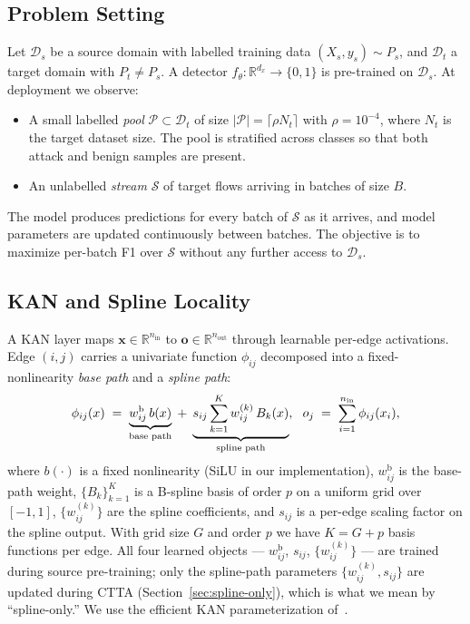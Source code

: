 \documentclass[10pt, conference, letterpaper]{IEEEtran}
\begin{document}
\subsection{Problem Setting}
\label{sec:problem}

Let $\mathcal{D}_s$ be a source domain with labelled training data $(X_s, y_s) \sim P_s$, and $\mathcal{D}_t$ a target domain with $P_t \neq P_s$. A detector $f_\theta : \mathbb{R}^{d_x} \to \{0,1\}$ is pre-trained on $\mathcal{D}_s$. At deployment we observe:
\begin{itemize}
    \item A small labelled \emph{pool} $\mathcal{P} \subset \mathcal{D}_t$ of size $|\mathcal{P}| = \lceil \rho N_t \rceil$ with $\rho = 10^{-4}$, where $N_t$ is the target dataset size. The pool is stratified across classes so that both attack and benign samples are present.
    \item An unlabelled \emph{stream} $\mathcal{S}$ of target flows arriving in batches of size $B$.
\end{itemize}
The model produces predictions for every batch of $\mathcal{S}$ as it arrives, and model parameters are updated continuously between batches. The objective is to maximize per-batch F1 over $\mathcal{S}$ without any further access to $\mathcal{D}_s$.

\subsection{KAN and Spline Locality}
\label{sec:kan}

A KAN layer maps $\mathbf{x} \in \mathbb{R}^{n_{\text{in}}}$ to $\mathbf{o} \in \mathbb{R}^{n_{\text{out}}}$ through learnable per-edge activations. Edge $(i,j)$ carries a univariate function $\phi_{ij}$ decomposed into a fixed-nonlinearity \emph{base path} and a \emph{spline path}:
\begin{equation}
\label{eq:kan-edge}
\phi_{ij}(x) \;=\; \underbrace{w^{\text{b}}_{ij}\, b(x)}_{\text{base path}} \;+\; \underbrace{s_{ij}\sum_{k=1}^{K} w_{ij}^{(k)}\, B_k(x)}_{\text{spline path}}, 
\hspace{1.5ex}
o_j \;=\; \sum_{i=1}^{n_{\text{in}}} \phi_{ij}(x_i),
\end{equation}
where $b(\cdot)$ is a fixed nonlinearity (SiLU in our implementation), $w^{\text{b}}_{ij}$ is the base-path weight, $\{B_k\}_{k=1}^{K}$ is a B-spline basis of order $p$ on a uniform grid over $[-1, 1]$, $\{w_{ij}^{(k)}\}$ are the spline coefficients, and $s_{ij}$ is a per-edge scaling factor on the spline output. With grid size $G$ and order $p$ we have $K = G + p$ basis functions per edge. All four learned objects --- $w^{\text{b}}_{ij}$, $s_{ij}$, $\{w_{ij}^{(k)}\}$ --- are trained during source pre-training; only the spline-path parameters $\{w_{ij}^{(k)}, s_{ij}\}$ are updated during CTTA (Section~\ref{sec:spline-only}), which is what we mean by ``spline-only.'' We use the efficient KAN parameterization of~\cite{liu2024kan}.
\end{document}
